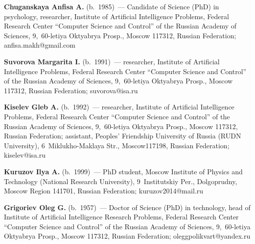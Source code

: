   \vspace*{3pt}
  
  
  \noindent
  \textbf{Chuganskaya Anfisa A.} (b.\ 1985)~--- Candidate of Science (PhD) in psychology, 
researcher, Institute of Artificial Intelligence Problems, Federal Research Center 
``Computer 
Science and Control'' of the Russian Academy of Sciences, 9,~60-letiya Oktyabrya Prosp., Moscow 
117312, Russian Federation; \mbox{anfisa.makh@gmail.com}
  
  \vspace*{3pt}
  
  
  \noindent
  \textbf{Suvorova Margarita I.} (b.\ 1991)~--- researcher, Institute of Artificial Intelligence 
Problems, Federal Research Center ``Computer Science and Control'' of the Russian Academy of 
Sciences, 9,~60-letiya Oktyabrya Prosp., Moscow 117312, Russian Federation; 
\mbox{suvorova@isa.ru}
  
  \vspace*{3pt}
  
  
  \noindent
  \textbf{Kiselev Gleb A.} (b.\ 1992)~--- researcher, Institute of Artificial Intelligence Problems, 
Federal Research Center ``Computer Science and Control'' of the Russian Academy of Sciences, 
9,~60-letiya Oktyabrya Prosp., Moscow 117312, Russian Federation; assistant, Peoples' Friendship 
University of Russia (RUDN University), 6~Miklukho-Maklaya Str., Moscow117198, Russian 
Federation; \mbox{kiselev@isa.ru}
  
  \vspace*{3pt}
  
  \noindent
  \textbf{Kuruzov Ilya A.} (b.\ 1999)~--- PhD student, Moscow Institute of Physics and 
Technology (National Research University), 9~Institutskiy Per., Dolgoprudny, Moscow Region 
141701, Russian Federation; \mbox{kuruzov2014@mail.ru}
  
  \vspace*{3pt}
  
  \noindent
  \textbf{Grigoriev Oleg G.} (b.\ 1957)~--- Doctor of Science (PhD) in technology, head of 
Institute of Artificial Intelligence Research Problems, Federal Research Center ``Computer Science and Control'' 
of the Russian Academy of Sciences, 9,~60-letiya Oktyabrya Prosp., Moscow 117312, Russian 
Federation; \mbox{oleggpolikvart@yandex.ru}
  


\label{end\stat}

\renewcommand{\bibname}{\protect\rm Литература} 
  